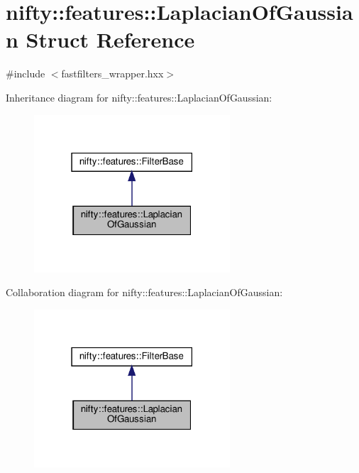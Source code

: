 \hypertarget{structnifty_1_1features_1_1LaplacianOfGaussian}{}\section{nifty\+:\+:features\+:\+:Laplacian\+Of\+Gaussian Struct Reference}
\label{structnifty_1_1features_1_1LaplacianOfGaussian}


{\ttfamily \#include $<$fastfilters\+\_\+wrapper.\+hxx$>$}



Inheritance diagram for nifty\+:\+:features\+:\+:Laplacian\+Of\+Gaussian\+:
\nopagebreak
\begin{figure}[H]
\begin{center}
\leavevmode
\includegraphics[width=207pt]{structnifty_1_1features_1_1LaplacianOfGaussian__inherit__graph}
\end{center}
\end{figure}


Collaboration diagram for nifty\+:\+:features\+:\+:Laplacian\+Of\+Gaussian\+:
\nopagebreak
\begin{figure}[H]
\begin{center}
\leavevmode
\includegraphics[width=207pt]{structnifty_1_1features_1_1LaplacianOfGaussian__coll__graph}
\end{center}
\end{figure}
